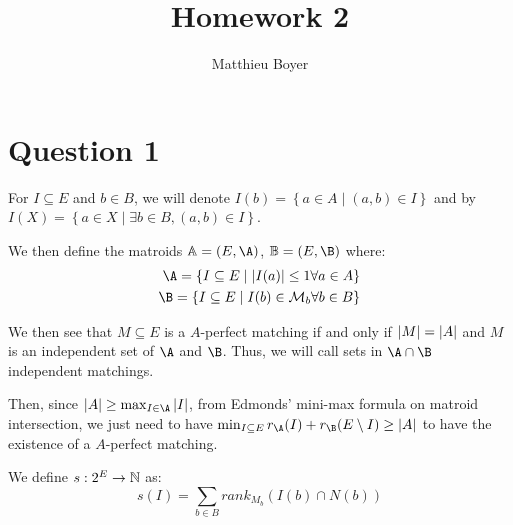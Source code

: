 \documentclass[math, info]{cours}
\author{Matthieu Boyer}
\title{Homework 2}
\begin{document}
\maketitle
\section{Question 1}
\begin{notationT}
	For $I \subseteq E$ and $b \in B$, we will denote $I(b) = \left\{ a \in A \mid (a, b) \in I \right\}$ and by $I(X) = \left\{ a\in X \mid \exists b\in B, (a, b) \in I \right\}$.
\end{notationT}

We then define the matroids $\mathbb{A} = (E, \A)$, $\mathbb{B} = (E, \B)$ where:
\begin{align*}
	\A = \left\{ I \subseteq E \mid \abs{I(a)} \leq 1 \forall a \in A\right\}\\
	\B = \left\{ I \subseteq E \mid I(b) \in \mathcal{M}_{b} \forall b \in B\right\}
\end{align*}

We then see that $M \subseteq E$ is a $A$-perfect matching if and only if $\left|M\right| = \left|A\right|$ and
$M$ is an independent set of $\A$ and $\B$.
Thus, we will call sets in $\A \cap \B$ independent matchings.

Then, since $\abs{A} \geq \max_{I \in \A}{\abs{I}}$, from Edmonds' mini-max formula on matroid intersection, we just need to have $\min_{I\subseteq E} r_{\A}(I) + r_{\B}(E\setminus I) \geq \abs{A}$ to have the existence of a $A$-perfect matching.

We define $s: 2^{E} \to \mathbb{N}$ as:
\begin{equation}
  s(I) = \sum_{b \in B} rank_{M_{b}}(I(b) \cap N(b))
\end{equation}
\end{document}
